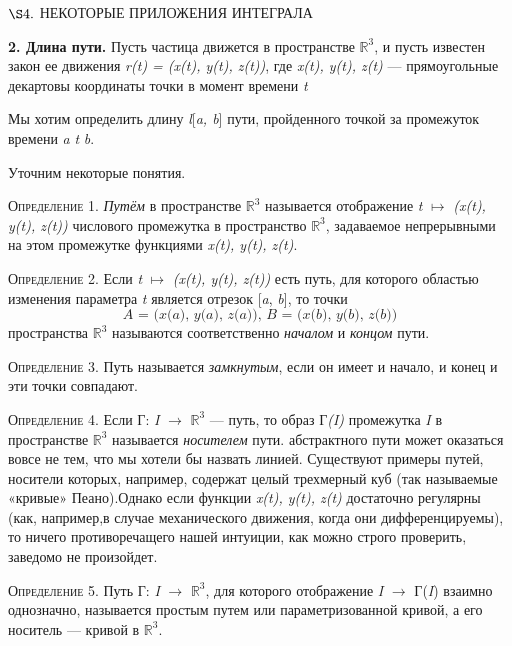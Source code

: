 \documentclass[a4paper, 10pt]{book}
\begin{document}
    \begin{center}
        $\S4.$ \scriptsize НЕКОТОРЫЕ ПРИЛОЖЕНИЯ ИНТЕГРАЛА
    \end{center}
    \par\small\textbf{2. Длина пути.} Пусть частица движется в пространстве $\mathbb{R}^{3}$, и пусть известен закон ее движения \textit{r(t) = (x(t), y(t), z(t))}, где \textit{x(t), y(t), z(t)} — прямоугольные декартовы координаты точки в момент времени \textit{t}
    \par Мы хотим определить длину \textit{l}[\textit{a, b}] пути, пройденного точкой за промежуток времени \textit{a} \leqslant \textit{t} \leqslant \textit{b}.
    \par Уточним некоторые понятия.
    \par\textsc{Определение 1.} \textit{Путём} в пространстве $\mathbb{R}^{3}$ называется отображение \textit{t} $\mapsto$ \textit{(x(t), y(t), z(t))} числового промежутка в пространство $\mathbb{R}^{3}$, задаваемое непрерывными на этом промежутке функциями \textit{x(t), y(t), z(t)}.
    \par\textsc{Определение 2.} Если \textit{t} $\mapsto$ \textit{(x(t), y(t), z(t))} есть путь, для которого областью изменения параметра \textit{t} является отрезок [\textit{a}, \textit{b}], то точки
    \[\textit{A = (x(a), y(a), z(a)), B = (x(b), y(b), z(b))}\]
    пространства $\mathbb{R}^{3}$ называются соответственно \textit{началом} и \textit{концом} пути.
    \par\textsc{Определение 3.} Путь называется \textit{замкнутым}, если он имеет и начало, и конец и эти точки совпадают.
    \par\textsc{Определение 4.} Если Г: \textit{I} $\rightarrow$ $\mathbb{R}^{3}$ — путь, то образ Г\textit{(I)} промежутка \textit{I} в пространстве $\mathbb{R}^{3}$ называется \textit{носителем} пути.
     абстрактного пути может оказаться вовсе не тем, что мы хотели бы назвать линией. Существуют примеры путей, носители которых, например, содержат целый трехмерный куб (так называемые «кривые» Пеано).Однако если функции \textit{x(t), y(t), z(t)} достаточно регулярны (как, например,в случае механического движения, когда они дифференцируемы), то ничего противоречащего нашей интуиции, как можно строго проверить, заведомо не произойдет.
    \par\textsc{Определение 5.} Путь Г: \textit{I} $\rightarrow$ $\mathbb{R}^{3}$, для которого отображение \textit{I} $\rightarrow$ Г(\textit{I}) взаимно однозначно, называется простым путем или параметризованной кривой, а его носитель — кривой в $\mathbb{R}^{3}$.
\end{document}
